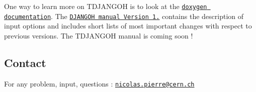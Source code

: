 One way to learn more on T\+D\+J\+A\+N\+G\+OH is to look at the \href{doc/index.html}{\tt doxygen documentation}. The \href{http://wwwthep.physik.uni-mainz.de/~hspiesb/djangoh/djangoh_m.4.6.6.ps.gz}{\tt D\+J\+A\+N\+G\+OH manual Version 1.} contains the description of input options and includes short lists of most important changes with respect to previous versions. The T\+D\+J\+A\+N\+G\+OH manual is coming soon !

\subsection*{Contact}

For any problem, input, questions \+: \href{mailto:nicolas.pierre@cern.ch}{\tt nicolas.\+pierre@cern.\+ch} 